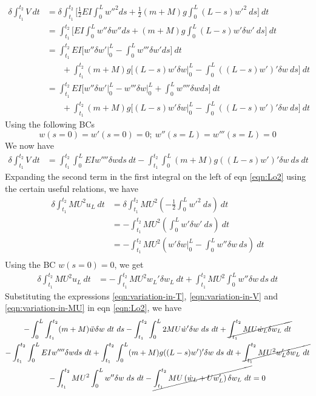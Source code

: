 \documentclass[12pt]{report}
\begin{document}
\begin{align*}
 \delta \int_{t_1}^{t_2} V~dt &= \delta \int_{t_1}^{t_2} \bigg[\frac{1}{2} EI \int_0^L  w''^2 ds + \frac{1}{2}(m + M)g\int_0^L (L - s) w'^2 ~ds \bigg]~dt \\
    &=\int_{t_1}^{t_2} \bigg[EI \int_0^L  w''\delta w'' ds + (m + M)g\int_0^L (L - s) w'\delta w'~ds \bigg]~dt \\
    &=\int_{t_1}^{t_2} EI \bigg[w''\delta w'\bigg|_0^L - \int_0^L  w'''\delta w' ds\bigg]~dt \\
    &\phantom{=}~~ + \int_{t_1}^{t_2}(m + M)g\bigg[(L - s) w'\delta w\bigg|_0^L - \int_0^L ((L - s) w')'\delta w~ds \bigg]~dt  \\
    &=\int_{t_1}^{t_2} EI \bigg[w''\delta w'\bigg|_0^L - w'''\delta w\bigg|_0^L +  \int_0^L  w''''\delta w ds\bigg]~dt \\
    &\phantom{=}~~ + \int_{t_1}^{t_2}(m + M)g\bigg[(L - s) w'\delta w\bigg|_0^L - \int_0^L ((L - s) w')'\delta w~ds \bigg]~dt
\end{align*}
Using the following BCs
$$w(s=0) = w'(s=0) = 0; ~ w''(s=L) = w'''(s=L)= 0$$
We now have
\begin{align}
  \delta \int_{t_1}^{t_2} V~dt &= \int_{t_1}^{t_2}\int_0^L  EI w''''\delta w ds~dt - \int_{t_1}^{t_2}\int_0^L (m + M)g ((L - s) w')'\delta w~ds~dt \label{eqn:variation-in-V}
\end{align}
Expanding the second term in the first integral on the left of eqn \ref{eqn:Lo2} using the certain useful relations, we have
\begin{align*}
\delta \int_{t_1}^{t_2}MU^2 u_L~dt &= \delta \int_{t_1}^{t_2}MU^2\left(-\frac{1}{2}\int_0^L w'^2~ds\right)~dt \\
    &= -\int_{t_1}^{t_2}MU^2\left(\int_0^L w'\delta w'~ds\right)~dt \\
    &= -\int_{t_1}^{t_2}MU^2\left(w'\delta w\bigg|_0^L - \int_0^L w''\delta w~ds\right)~dt \\
\end{align*}
Using the BC $w(s=0) = 0$, we get
\begin{align}
  \delta \int_{t_1}^{t_2}MU^2 u_L~dt &= -\int_{t_1}^{t_2}MU^2w_L'\delta w_L~dt + \int_{t_1}^{t_2}MU^2\int_0^L w''\delta w~ds~dt  \label{eqn:variation-in-MU}
\end{align}
Substituting the expressions \ref{eqn:variation-in-T}, \ref{eqn:variation-in-V} and \ref{eqn:variation-in-MU} in eqn \ref{eqn:Lo2}, we have 
\begin{multline*}
   -\int_0^L\int_{t_1}^{t_2} (m + M) \ddot{w}\delta w~dt~ds - \int_{t_1}^{t_2}\int_0^L 2MU\dot{w}'\delta w~ds~dt  + \cancel{\int_{t_1}^{t_2} MU\dot{w}_L\delta w_L~dt} \\
   - \int_{t_1}^{t_2}\int_0^L  EI w''''\delta w ds~dt + \int_{t_1}^{t_2}\int_0^L (m + M)g ((L - s) w')'\delta w~ds~dt + \cancel{\int_{t_1}^{t_2}MU^2w_L'\delta w_L~dt} \\
    - \int_{t_1}^{t_2}MU^2\int_0^L w''\delta w~ds~dt - \cancel{\int_{t_1}^{t_2}MU\left(\dot{w}_L + Uw_L'\right)\delta w_L~dt} = 0 
\end{multline*}
\end{document}
